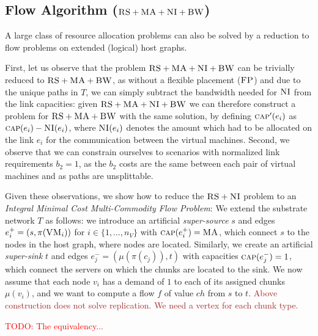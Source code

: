 \documentclass[9pt,twocolumn]{scrartcl}
\newcommand{\Capacity}{\ensuremath{\textsc{cap}}}
\newcommand{\VM}{\textsc{VM}}
\newcommand{\carlo}[1]{\textcolor{red}{#1}}
\newcommand{\maciek}[1]{\textcolor{brown}{#1}}
\newcommand{\MaFactor}{\ensuremath{\textsc{MA}}}
\newcommand{\Source}{\ensuremath{s}}
\newcommand{\Sink}{\ensuremath{t}}
\newcommand{\VmChunkAssignment}{\mu}
\newcommand{\NodeMapping}{\pi}
\newcommand{\ChunkLocation}{\pi}
\newcommand{\VirtualNode}{v}
\newcommand{\SubstrateEdge}{\ensuremath{e}}
\newcommand{\achunk}{\ensuremath{c}}
\newcommand{\CC}{\textsc{NI}}
\newcommand{\FP}{\textsc{FP}}
\newcommand{\RS}{\textsc{RS}}
\newcommand{\BW}{\textsc{BW}}
\newcommand{\MA}{\textsc{MA}}
\newcommand{\Tree}{\ensuremath{T}}
\newcommand{\CostTrans}{\ensuremath{b_2}}
\newcommand{\Vms}{\ensuremath{n_V}}
\newcommand{\ChunkTypes}{\ensuremath{ch}}
\begin{document}
\subsection{Flow Algorithm ($\RS+\MA+\CC+\BW$)}

A large class of resource allocation problems can also be solved by a reduction to flow 
problems on extended (logical) host graphs.

First, let us observe that the problem $\RS+\MA+\CC+\BW$ 
can be trivially reduced to $\RS+\MA+\BW$, as without a flexible
placement ($\FP$) and due to the unique paths in $\Tree$, we can simply subtract the bandwidth needed
for $\CC$ from the link capacities: given $\RS+\MA+\CC+\BW$
we can therefore construct a
problem for $\RS+\MA+\BW$ with the same solution, by defining
$\Capacity'(\SubstrateEdge_i)$ as
$\Capacity(\SubstrateEdge_i) - \CC(\SubstrateEdge_i)$, where
$\CC(\SubstrateEdge_i)$ denotes the amount which
had to be allocated on the link $\SubstrateEdge_i$ for the communication
between the virtual machines. 
Second, we observe that we can constrain ourselves to scenarios with  normalized link 
requirements $\CostTrans = 1$, as the $\CostTrans$ costs are
the same between each pair of virtual machines and as paths are unsplittable. 

Given these observations, we show how to reduce the $\RS+\CC$ problem
to an \emph{Integral Minimal Cost Multi-Commodity Flow Problem}: 
We extend the substrate network $\Tree$ as follows: we introduce an
artificial \emph{super-source} $\Source$ and edges $\SubstrateEdge_i^+ = (\Source,
\NodeMapping(\VM_i))$ for
$i \in \{1,\dots,\Vms\}$ with $\Capacity(\SubstrateEdge_i^+) = \MaFactor$,
which connect $\Source$
to the nodes in the host graph, where nodes are located.
Similarly, we create an artificial \emph{super-sink} $\Sink$ and edges $\SubstrateEdge_j^- =
(\VmChunkAssignment(\ChunkLocation(\achunk_j)), \Sink)$ with capacities
$\Capacity(\SubstrateEdge_j^-) = 1$, which connect the servers on which the
chunks are located to the sink. We now assume that each node $\VirtualNode_i$ has a demand of $1$ to each
of its assigned chunks $\VmChunkAssignment(\VirtualNode_i)$,
and we want to compute a flow $f$
of value $\ChunkTypes$ from $\Source$ to $\Sink$. \maciek{Above construction does not solve replication. We need a vertex for each chunk type.}

\carlo{TODO: The
equivalency...}
\end{document}
